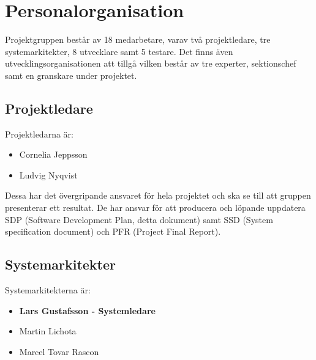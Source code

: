 ﻿\documentclass[a4paper]{article}
\begin{document}
\section{Personalorganisation}
\begin{comment}En beskrivning av personalorganisationen som anger hur mycket personal som behövs, när de behövs, och var de behövs. Ansvarsförhållande och ansvarsområde för respektive person skall också anges.

Det ska vara tydligt vilka ansvarsområden som finns samt vem som har ansvar för vad.

Beskriv t.ex. vem som är projektledare, vem som är med i systemgruppen, vem som är med i testgruppen, vem som är med i de olika testgrupperna osv. Beskriv även vilka externa intressenter det finns till projektet.\end{comment}

Projektgruppen består av 18 medarbetare, varav två projektledare, tre systemarkitekter, 8 utvecklare samt 5 testare. Det finns även utvecklingsorganisationen att tillgå vilken består av tre experter, sektionschef samt en granskare under projektet.

\subsection{Projektledare}
Projektledarna är:
\begin{itemize}
\item{Cornelia Jeppsson}
\item{Ludvig Nyqvist}
\end{itemize}

Dessa har det övergripande ansvaret för hela projektet och ska se till att gruppen presenterar ett resultat. De har ansvar för att producera och löpande uppdatera SDP (Software Development Plan, detta dokument) samt SSD (System specification document) och PFR (Project Final Report).

\subsection{Systemarkitekter}
Systemarkitekterna är:
\begin{itemize}
\item{{\bf Lars Gustafsson - Systemledare}}
\item{Martin Lichota}
\item{Marcel Tovar Rascon}
\end{itemize}
\end{document}
